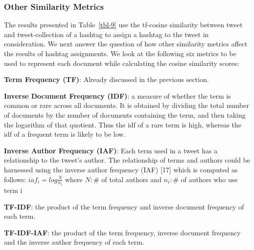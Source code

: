 \documentclass[10pt,a5paper,twoside]{article}
\begin{document}
\subsubsection{Other Similarity Metrics}
The results presented in Table~\ref{tbl-9} use the tf-cosine similarity between tweet and tweet-collection of a hashtag to assign a hashtag to the tweet in  consideration. We next answer the question of how other similarity metrics affect the results of hashtag assignments. We look at the following six metrics to be used to represent each document while calculating the cosine similarity scores:
\begin{description}
\item{\bf Term Frequency (TF)}: Already discussed in the previous section.
\item{\bf Inverse Document Frequency (IDF)}:  a measure of whether the term is common or rare across all documents. It is obtained by dividing the total number of documents by the number of documents containing the term, and then taking the logarithm of that quotient. Thus the idf of a rare term is high, whereas the idf of a frequent term is likely to be low.
\item{\bf Inverse Author Frequency (IAF)}: Each term used in a tweet has a relationship to the tweet's author. The relationship of terms and authors could be harnessed using the inverse author frequency (IAF) [17] which is computed as follows:
$iaf_i = log \frac{N}{n_i}$
where $N: \#$ of total authors and $n_i: \#$ of authors who use term i
\item{\bf TF-IDF}: the product of the term frequency and inverse document frequency of each term.
\item{\bf TF-IDF-IAF}: the product of the term frequency, inverse document frequency and the inverse author frequency of each term.
\end{description}

\end{document}
